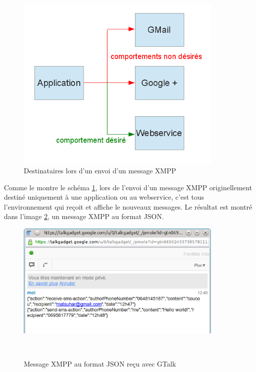 \begin{figure}[!h]
	\center
	\includegraphics[width=10cm]{img/broadcast-xmpp.png}
	\caption{Destinataires lors d'un envoi d'un message XMPP}
	\label{broadcast-xmpp}
\end{figure}

Comme le montre le schéma \ref{broadcast-xmpp}, lors de l'envoi d'un message XMPP originellement destiné uniquement à une application ou au webservice, c'est tous l'environnement qui reçoit et affiche le nouveaux messages.
Le résultat est montré dans l'image \ref{message-xmpp-json-gmail}, un message XMPP au format JSON. 
	
\begin{figure}[!h]
	\center
	\includegraphics[width=10cm]{img/message-xmpp-json-gmail.png}
	\caption{Message XMPP au format JSON reçu avec GTalk}
	\label{message-xmpp-json-gmail}
~~\\
\end{figure}






